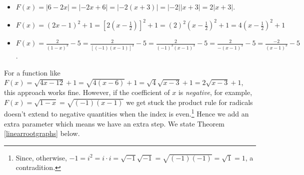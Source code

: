 \documentclass{ximera}
\begin{document}
\begin{itemize}

\item  $F(x) = |6-2x| = |-2x+6| = |-2(x+3)| = |-2||x+3| = 2 |x+3|$.

\item  $F(x) = (2x-1)^2 + 1 = \left[2 \left(x - \frac{1}{2}\right)\right]^2+1 = (2)^2 \left(x - \frac{1}{2}\right)^2  + 1 =  4\left(x - \frac{1}{2}\right)^2 + 1$

\item  $F(x) = \frac{2}{(1-x)^3}- 5 = \frac{2}{[(-1)(x-1)]^3} - 5= \frac{2}{(-1)^3(x-1)^3} - 5 = \frac{2}{- (x-1)^3} - 5 = \frac{-2}{(x-1)^3} - 5$.

\end{itemize}

For a function like $F(x) = \sqrt{4x-12} + 1 = \sqrt{4(x-6)} + 1 = \sqrt{4}\sqrt{x-3} + 1 = 2 \sqrt{x-3} + 1$, this approach works fine.   However, if the coefficient of $x$ is \textit{negative},   for example, $F(x) = \sqrt{1-x} = \sqrt{(-1)(x-1)}$ we get stuck the product rule for radicals doesn't extend to negative quantities when the index is even.\footnote{Since, otherwise, $-1 = i^2 = i \cdot i = \sqrt{-1}\sqrt{-1} = \sqrt{(-1)(-1)} = \sqrt{1} = 1$, a contradition.}   Hence we add an extra parameter which means we have an extra step.  We state Theorem \ref{linearrootgraphs} below.
\end{document}
